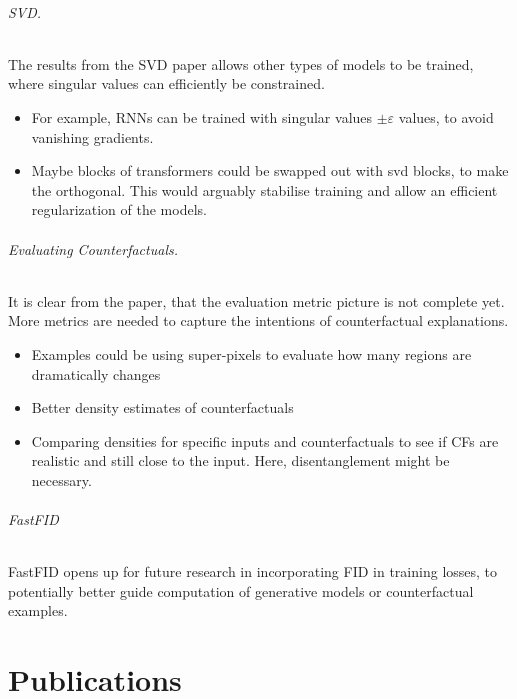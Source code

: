 \documentclass[11pt,a4paper,twoside,openright,final]{memoir}
\begin{document}
\paragraph{SVD.}
The results from the SVD paper allows other types of models to be trained, where singular values can efficiently be constrained.
\begin{itemize}
    \item For example, RNNs can be trained with singular values $\pm \varepsilon$ values, to avoid vanishing gradients.
    \item Maybe blocks of transformers could be swapped out with svd blocks, to make the orthogonal. This would arguably stabilise training and allow an efficient regularization of the models.
\end{itemize}


\paragraph{Evaluating Counterfactuals.}
It is clear from the paper, that the evaluation metric picture is not complete yet.
More metrics are needed to capture the intentions of counterfactual explanations.
\begin{itemize}
    \item Examples could be using super-pixels to evaluate how many regions are dramatically changes
    \item Better density estimates of counterfactuals
    \item Comparing densities for specific inputs and counterfactuals to see if CFs are realistic and still close to the input. Here, disentanglement might be necessary.
\end{itemize}


\paragraph{FastFID}
FastFID opens up for future research in incorporating FID in training losses, to potentially better guide computation of generative models or counterfactual examples. 




\part{Publications}
\label{part:publications}
\end{document}
